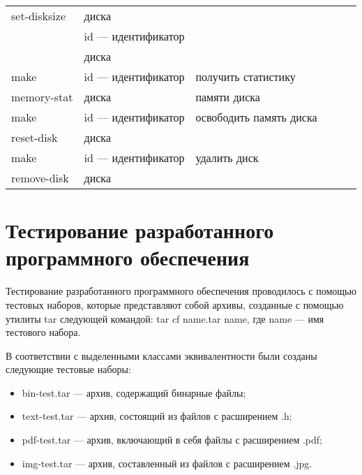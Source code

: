 \begin{table}[h]
\begin{center}
\begin{tabular}{|l|l|l|l|l|l|}
            \multicolumn{1}{|l}{set-disksize} & \multicolumn{1}{|l}{диска} & \multicolumn{1}{|l|}{} \\
            \multicolumn{1}{|l}{} & \multicolumn{1}{|l}{id --- идентификатор} & \multicolumn{1}{|l|}{} \\
            \multicolumn{1}{|l}{} & \multicolumn{1}{|l}{диска} & \multicolumn{1}{|l|}{} \\ \hline
            \multicolumn{1}{|l}{make} & \multicolumn{1}{|l}{id --- идентификатор} & \multicolumn{1}{|l|}{получить статистику} \\
            \multicolumn{1}{|l}{memory-stat} & \multicolumn{1}{|l}{диска} & \multicolumn{1}{|l|}{памяти диска} \\ \hline
            \multicolumn{1}{|l}{make} & \multicolumn{1}{|l}{id --- идентификатор} & \multicolumn{1}{|l|}{освободить память диска} \\
            \multicolumn{1}{|l}{reset-disk} & \multicolumn{1}{|l}{диска} & \multicolumn{1}{|l|}{} \\ \hline
            \multicolumn{1}{|l}{make} & \multicolumn{1}{|l}{id --- идентификатор} & \multicolumn{1}{|l|}{удалить диск} \\
            \multicolumn{1}{|l}{remove-disk} & \multicolumn{1}{|l}{диска} & \multicolumn{1}{|l|}{} \\ \hline
        \end{tabular}
    \end{center}
    \label{tab:comparison}
\end{table}

\section{Тестирование разработанного программного обеспечения}

Тестирование разработанного программного обеспечения проводилось с помощью тестовых наборов, которые представляют собой архивы, созданные с помощью утилиты tar \cite{tar} следующей командой: tar cf name.tar name, где name --- имя тестового набора. 

В соответствии с выделенными классами эквивалентности были созданы следующие тестовые наборы:

\begin{itemize}
    \item bin-test.tar --- архив, содержащий бинарные файлы;
    \item text-test.tar --- архив, состоящий из файлов с расширением .h;
    \item pdf-test.tar --- архив, включающий в себя файлы с расширением .pdf;
    \item img-test.tar --- архив, составленный из файлов с расширением .jpg.
\end{itemize}

